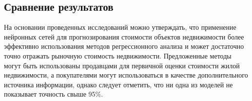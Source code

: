 \subsection{Сравнение результатов}
\label{sec:experiment:conclusion}

На основании проведенных исследований можно утверждать, что применение нейронных сетей для прогнозирования
стоимости объектов недвижимости более эффективно использования методов регрессионного анализа и может достаточно
точно отражать рыночную стоимость недвижимости. Предложенные методы могут быть использованы продавцами для первичной
оценки стоимости жилой недвижимости,
а покупателями могут использоваться в качестве дополнительного источника информации, однако следует отметить, что
ни одна из моделей не показывает точность свыше 95\%.
